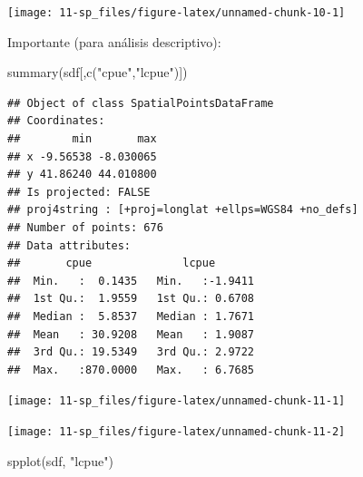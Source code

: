 \documentclass[
  spanish,
]{book}
\newenvironment{Shaded}{\begin{snugshade}}{\end{snugshade}}
\newcommand{\FunctionTok}[1]{\textcolor[rgb]{0.00,0.00,0.00}{#1}}
\newcommand{\NormalTok}[1]{#1}
\newcommand{\SpecialCharTok}[1]{\textcolor[rgb]{0.00,0.00,0.00}{#1}}
\newcommand{\StringTok}[1]{\textcolor[rgb]{0.31,0.60,0.02}{#1}}
\theoremstyle{break}
\theoremstyle{definition}
\theoremstyle{definition}
\theoremstyle{definition}
\theoremstyle{definition}
\theoremstyle{remark}
\begin{document}
\begin{center}\texttt{[image: 11-sp\_files/figure-latex/unnamed-chunk-10-1]} \end{center}

Importante (para análisis descriptivo):

\begin{Shaded}
\begin{Highlighting}[]
\FunctionTok{summary}\NormalTok{(sdf[,}\FunctionTok{c}\NormalTok{(}\StringTok{"cpue"}\NormalTok{,}\StringTok{"lcpue"}\NormalTok{)])}
\end{Highlighting}
\end{Shaded}

\begin{verbatim}
## Object of class SpatialPointsDataFrame
## Coordinates:
##        min       max
## x -9.56538 -8.030065
## y 41.86240 44.010800
## Is projected: FALSE 
## proj4string : [+proj=longlat +ellps=WGS84 +no_defs]
## Number of points: 676
## Data attributes:
##       cpue              lcpue        
##  Min.   :  0.1435   Min.   :-1.9411  
##  1st Qu.:  1.9559   1st Qu.: 0.6708  
##  Median :  5.8537   Median : 1.7671  
##  Mean   : 30.9208   Mean   : 1.9087  
##  3rd Qu.: 19.5349   3rd Qu.: 2.9722  
##  Max.   :870.0000   Max.   : 6.7685
\end{verbatim}

\begin{Shaded}
\end{Shaded}

\begin{center}\texttt{[image: 11-sp\_files/figure-latex/unnamed-chunk-11-1]} \end{center}

\begin{Shaded}
\end{Shaded}

\begin{center}\texttt{[image: 11-sp\_files/figure-latex/unnamed-chunk-11-2]} \end{center}

\begin{Shaded}
\begin{Highlighting}[]
\FunctionTok{spplot}\NormalTok{(sdf, }\StringTok{"lcpue"}\NormalTok{)}
\end{Highlighting}
\end{Shaded}
\end{document}
